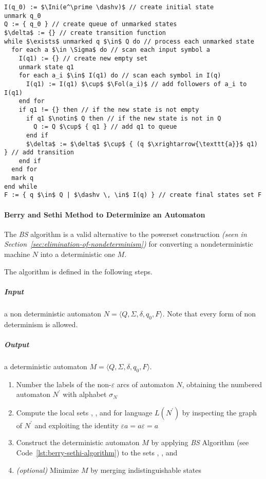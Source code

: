 \documentclass[english]{article}
\begin{document}
\begin{lstlisting}[caption={Berry and Sethi Algorithm}, label=lst:berry-sethi-algorithm]
I(q_0) := $\Ini(e^\prime \dashv)$ // create initial state
unmark q_0
Q := { q_0 } // create queue of unmarked states
$\delta$ := {} // create transition function
while $\exists$ unmarked q $\in$ Q do // process each unmarked state
  for each a $\in \Sigma$ do // scan each input symbol a
    I(q1) := {} // create new empty set
    unmark state q1
    for each a_i $\in$ I(q1) do // scan each symbol in I(q)
      I(q1) := I(q1) $\cup$ $\Fol(a_i)$ // add followers of a_i to I(q1)
    end for
    if q1 != {} then // if the new state is not empty
      if q1 $\notin$ Q then // if the new state is not in Q
        Q := Q $\cup$ { q1 } // add q1 to queue
      end if
      $\delta$ := $\delta$ $\cup$ { (q $\xrightarrow{\texttt{a}}$ q1) } // add transition
    end if
  end for
  mark q
end while
F := { q $\in$ Q | $\dashv \, \in$ I(q) } // create final states set F
\end{lstlisting}

\paragraph{Berry and Sethi Method to Determinize an Automaton}
The \textit{BS} algorithm is a valid alternative to the powerset construction \textit{(seen in Section~\ref{sec:elimination-of-nondeterminism})}
for converting a nondeterministic machine \(N\) into a deterministic one \(M\).

The algorithm is defined in the following steps.

\subparagraph*{Input}
a non deterministic automaton \(N = \langle Q, \Sigma, \delta, q_0, F \rangle\).
Note that every form of non determinism is allowed.

\subparagraph*{Output}
a deterministic automaton \(M = \langle Q, \Sigma, \delta, q_0, F \rangle\).

\begin{enumerate}
  \item Number the labels of the non-\(\varepsilon\) arcs of automaton \(N\), obtaining the numbered automaton \(N^\prime\) with alphabet \(\sigma_N\)
  \item Compute the local sets \Ini, \Fin, and \Fol for language \(L(N^\prime)\) by inspecting the graph of \(N^\prime\) and exploiting the identity \(\varepsilon a = a \varepsilon = a\)
  \item Construct the deterministic automaton \(M\) by applying \textit{BS} Algorithm (see Code~\ref{lst:berry-sethi-algorithm}) to the sets \Ini, \Fin, and \Fol
  \item \textit{(optional)} Minimize \(M\) by merging indistinguishable states
\end{enumerate}
\end{document}
